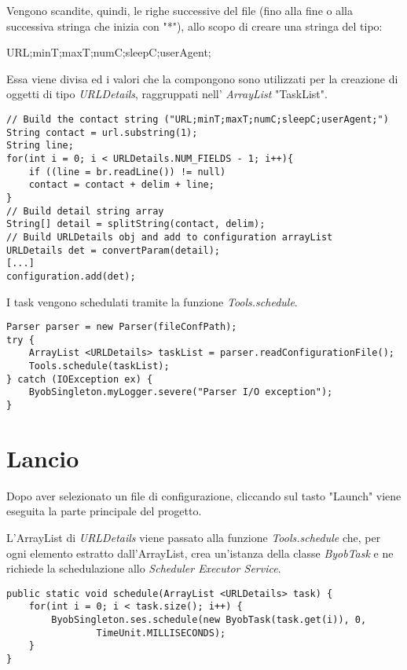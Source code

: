 Vengono scandite, quindi, le righe successive del file (fino alla fine o alla successiva stringa che inizia con "*"), allo scopo di creare una stringa del tipo:

\vspace{0.5cm}
\begin{normalsize}
	URL;minT;maxT;numC;sleepC;userAgent;
\end{normalsize}

\vspace{0.5cm}
Essa viene divisa ed i valori che la compongono sono utilizzati per la creazione di oggetti di tipo \textit{URLDetails}, raggruppati nell' \textit{ArrayList} "TaskList".

\vspace{0.5cm}
\begin{lstlisting}
// Build the contact string ("URL;minT;maxT;numC;sleepC;userAgent;")
String contact = url.substring(1);
String line;
for(int i = 0; i < URLDetails.NUM_FIELDS - 1; i++){
	if ((line = br.readLine()) != null)
	contact = contact + delim + line;
}
// Build detail string array
String[] detail = splitString(contact, delim);
// Build URLDetails obj and add to configuration arrayList
URLDetails det = convertParam(detail);
[...]
configuration.add(det);
\end{lstlisting}


I task vengono schedulati tramite la funzione \textit{Tools.schedule}.

\vspace{0.5cm}
\begin{lstlisting}
Parser parser = new Parser(fileConfPath);
try {
	ArrayList <URLDetails> taskList = parser.readConfigurationFile();
	Tools.schedule(taskList);
} catch (IOException ex) {
	ByobSingleton.myLogger.severe("Parser I/O exception");
}
\end{lstlisting}


\section{Lancio}
Dopo aver selezionato un file di configurazione, cliccando sul tasto "Launch" viene eseguita la parte principale del progetto.

L'ArrayList di \textit{URLDetails} viene passato alla funzione \textit{Tools.schedule} che, per ogni elemento estratto dall'ArrayList, crea un'istanza della classe \textit{ByobTask} e ne richiede la schedulazione allo \textit{Scheduler Executor Service}.

\vspace{0.5cm}
\begin{lstlisting}
public static void schedule(ArrayList <URLDetails> task) {
    for(int i = 0; i < task.size(); i++) {
	    ByobSingleton.ses.schedule(new ByobTask(task.get(i)), 0,
			    TimeUnit.MILLISECONDS);
    }
}
\end{lstlisting}


